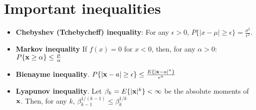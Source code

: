 \documentclass[a4paper, oneside]{book}
\begin{document}
\section{Important inequalities}
\begin{itemize}
\item \textbf{Chebyshev (Tchebycheff) inequality}: For any $\epsilon >0$, $P\{|x-\mu| \ge \epsilon\} = \frac{\sigma^2}{\epsilon^2}$.
\item \textbf{Markov inequality} If $f(x)=0$ for $x<0$, then, for any $\alpha > 0$: $P\{ \mathbf x \ge \alpha \} \le \frac{\mu}{\alpha}$
\item \textbf{Bienayme inequality}. $P\{ |\mathbf x - a| \ge \epsilon\} \le \frac{E\{ |\mathbf x - a|^n \}}{\epsilon^n}$
\item \textbf{Lyapunov inequality}. Let $\beta_k = E\{|\mathbf x|^k\} < \infty$ be the absolute moments of $\mathbf x$. Then, for any $k$, $\beta^{1/(k-1)}_{k-1} \le \beta_k^{1/k}$
\end{itemize}
\end{document}
